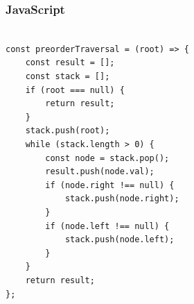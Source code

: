 \documentclass[11pt]{article}
\begin{document}
\subsubsection{JavaScript}

\begin{verbatim}

const preorderTraversal = (root) => {
    const result = [];
    const stack = [];
    if (root === null) {
        return result;
    }
    stack.push(root);
    while (stack.length > 0) {
        const node = stack.pop();
        result.push(node.val);
        if (node.right !== null) {
            stack.push(node.right);
        }
        if (node.left !== null) {
            stack.push(node.left);
        }
    }
    return result;
};

\end{verbatim}

\end{document}
